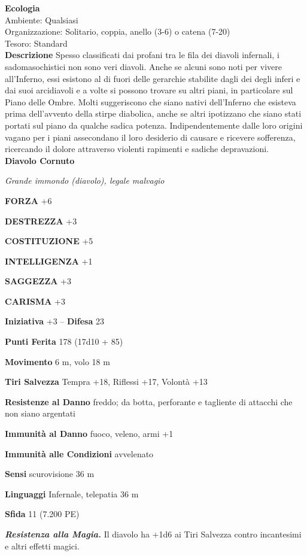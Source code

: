\begin{multicols}{2}
\textbf{Ecologia}\\
Ambiente: Qualsiasi\\
Organizzazione: Solitario, coppia, anello (3-6) o catena (7-20)\\
Tesoro: Standard\\
\textbf{Descrizione}
Spesso classificati dai profani tra le fila dei diavoli infernali, i sadomasochistici non sono veri diavoli. Anche se alcuni sono noti per vivere all'Inferno, essi esistono al di fuori delle gerarchie stabilite dagli dei degli inferi e dai suoi arcidiavoli e a volte si possono trovare su altri piani, in particolare sul Piano delle Ombre. Molti suggeriscono che siano nativi dell'Inferno che esisteva prima dell'avvento della stirpe diabolica, anche se altri ipotizzano che siano stati portati sul piano da qualche sadica potenza. Indipendentemente dalle loro origini vagano per i piani assecondano il loro desiderio di causare e ricevere sofferenza, ricercando il dolore attraverso violenti rapimenti e sadiche depravazioni.\\


\medskip{}\textbf{Diavolo Cornuto}

\emph{Grande immondo (diavolo), legale malvagio}

\textbf{FORZA} +6

\textbf{DESTREZZA} +3

\textbf{COSTITUZIONE} +5

\textbf{INTELLIGENZA} +1

\textbf{SAGGEZZA} +3

\textbf{CARISMA} +3

\textbf{Iniziativa} +3 -- \textbf{Difesa} 23

\textbf{Punti Ferita} 178 (17d10 + 85)

\textbf{Movimento} 6 m, volo 18 m

\textbf{Tiri Salvezza} Tempra +18, Riflessi +17, Volontà +13

\textbf{Resistenze al Danno} freddo; da botta, perforante e tagliente di attacchi che non siano argentati

\textbf{Immunità al Danno} fuoco, veleno, armi +1

\textbf{Immunità alle Condizioni} avvelenato

\textbf{Sensi} scurovisione 36 m

\textbf{Linguaggi} Infernale, telepatia 36 m 

\textbf{Sfida} 11 (7.200 PE)

\emph{\textbf{Resistenza alla Magia.}} Il diavolo ha +1d6 ai Tiri Salvezza contro incantesimi e altri effetti magici.


\end{multicols}
